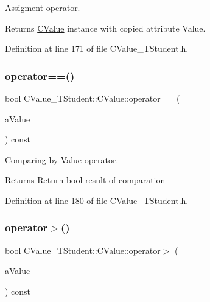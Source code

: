 Assigment operator. 

\begin{DoxyReturn}{Returns}
\hyperlink{class_c_value___t_student_1_1_c_value}{C\+Value} instance with copied attribute Value. 
\end{DoxyReturn}


Definition at line 171 of file C\+Value\+\_\+\+T\+Student.\+h.

\mbox{\label{class_c_value___t_student_1_1_c_value_a81e74014d65406bce259c0b37df25992}} 
\subsubsection{\texorpdfstring{operator==()}{operator==()}}
{\footnotesize\ttfamily bool C\+Value\+\_\+\+T\+Student\+::\+C\+Value\+::operator== (\begin{DoxyParamCaption}\item[{const \hyperlink{class_c_value___t_student_1_1_c_value}{C\+Value} \&}]{a\+Value }\end{DoxyParamCaption}) const\hspace{0.3cm}{\ttfamily [inline]}}



Comparing by Value operator. 

\begin{DoxyReturn}{Returns}
Return {\ttfamily bool} result of comparation 
\end{DoxyReturn}


Definition at line 180 of file C\+Value\+\_\+\+T\+Student.\+h.

\mbox{\label{class_c_value___t_student_1_1_c_value_a5388821b6aef1ce4a0e5411145af9d72}} 
\subsubsection{\texorpdfstring{operator$>$()}{operator>()}}
{\footnotesize\ttfamily bool C\+Value\+\_\+\+T\+Student\+::\+C\+Value\+::operator$>$ (\begin{DoxyParamCaption}\item[{const \hyperlink{class_c_value___t_student_1_1_c_value}{C\+Value} \&}]{a\+Value }\end{DoxyParamCaption}) const\hspace{0.3cm}{\ttfamily [inline]}}



